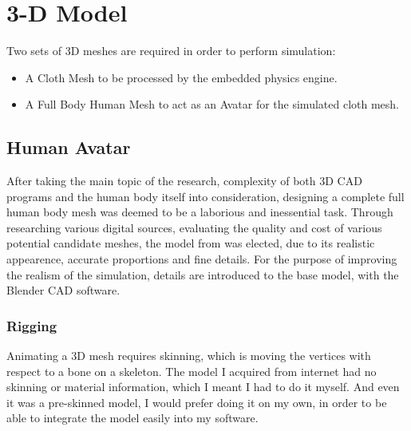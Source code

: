 \chapter{3-D Model}
\label{chapter_3d_model}

Two sets of 3D meshes are required in order to perform simulation: 
\begin{itemize}
\item A Cloth Mesh to be processed by the embedded physics engine.
\item A Full Body Human Mesh to act as an Avatar for the simulated cloth mesh.
\end{itemize}

\section{Human Avatar}
\label{section_human_avatar}



After taking the main topic of the research, complexity of both 3D CAD programs and the human body itself into consideration, designing a complete full human body mesh was deemed to be a laborious and inessential task. Through researching various digital sources, evaluating the quality and cost of various potential candidate meshes, the model from \cite{Mmava2012} was elected, due to its realistic appearence, accurate proportions and fine details. For the purpose of improving the realism of the simulation, details are introduced to the base model, with the Blender CAD software.  

\subsection{Rigging}

Animating a 3D mesh requires skinning, which is moving the vertices with respect to a bone on a skeleton. The model I acquired from internet had no skinning or material information, which I meant I had to do it myself. And even it was a pre-skinned model, I would prefer doing it on my own, in order to be able to integrate the model easily into my software. 

